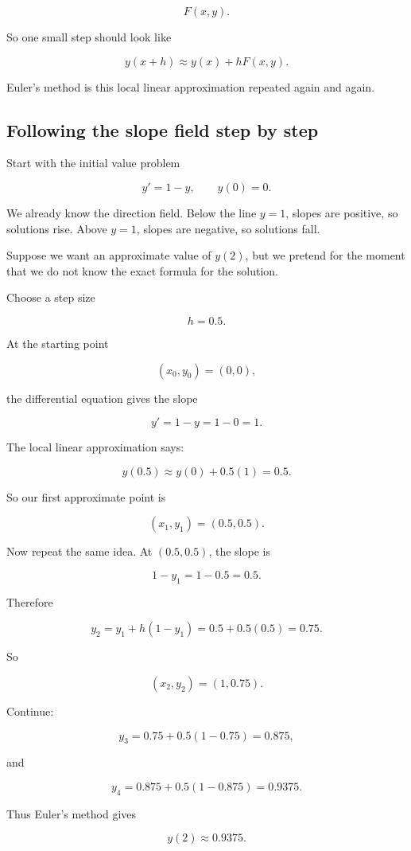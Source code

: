 \[
F(x,y).
\]

So one small step should look like

\[
y(x+h)\approx y(x)+hF(x,y).
\]

Euler's method is this local linear approximation repeated again and again.

\subsection{Following the slope field step by step}
\label{subsec:following-slope-field-step-by-step}

Start with the initial value problem

\[
y'=1-y,
\qquad
y(0)=0.
\]

We already know the direction field.  Below the line \(y=1\), slopes are positive, so
solutions rise.  Above \(y=1\), slopes are negative, so solutions fall.

Suppose we want an approximate value of \(y(2)\), but we pretend for the moment that
we do not know the exact formula for the solution.

Choose a step size

\[
h=0.5.
\]

At the starting point

\[
(x_0,y_0)=(0,0),
\]

the differential equation gives the slope

\[
y'=1-y=1-0=1.
\]

The local linear approximation says:

\[
y(0.5)\approx y(0)+0.5(1)=0.5.
\]

So our first approximate point is

\[
(x_1,y_1)=(0.5,0.5).
\]

Now repeat the same idea.  At \((0.5,0.5)\), the slope is

\[
1-y_1=1-0.5=0.5.
\]

Therefore

\[
y_2=y_1+h(1-y_1)=0.5+0.5(0.5)=0.75.
\]

So

\[
(x_2,y_2)=(1,0.75).
\]

Continue:

\[
y_3=0.75+0.5(1-0.75)=0.875,
\]

and

\[
y_4=0.875+0.5(1-0.875)=0.9375.
\]

Thus Euler's method gives

\[
\boxed{
y(2)\approx0.9375.
}
\]


